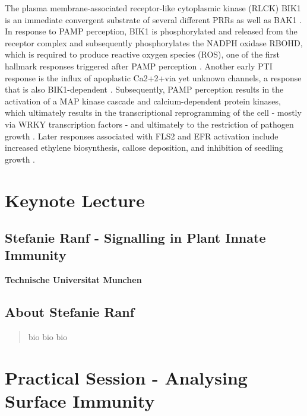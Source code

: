 \documentclass[12pt,]{book}
\begin{document}
The plasma membrane-associated receptor-like cytoplasmic kinase (RLCK)
BIK1 is an immediate convergent substrate of several different PRRs as
well as BAK1 \citep{Couto:2016kq}. In response to PAMP perception, BIK1
is phosphorylated and released from the receptor complex and
subsequently phosphorylates the NADPH oxidase RBOHD, which is required
to produce reactive oxygen species (ROS), one of the first hallmark
responses triggered after PAMP perception
\citep{Kadota:2014bi, Li:2014dx}. Another early PTI response is the
influx of apoplastic Ca2+2+via yet unknown channels, a response that is
also BIK1-dependent \citep{Li:2014dx, Ranf:2014fg, Seybold:2014wt}.
Subsequently, PAMP perception results in the activation of a MAP kinase
cascade and calcium-dependent protein kinases, which ultimately results
in the transcriptional reprogramming of the cell - mostly via WRKY
transcription factors - and ultimately to the restriction of pathogen
growth \citep{Couto:2016kq}. Later responses associated with FLS2 and
EFR activation include increased ethylene biosynthesis, callose
deposition, and inhibition of seedling growth \citep{Boller:2009hu}.

\section*{Keynote Lecture}\label{keynote-lecture-3}

\subsection*{Stefanie Ranf - Signalling in Plant Innate
Immunity}\label{stefanie-ranf---signalling-in-plant-innate-immunity}

\textbf{Technische Universitat Munchen}

\subsection*{About Stefanie Ranf}\label{about-stefanie-ranf}

\begin{quote}
bio bio bio
\end{quote}

\section*{Practical Session - Analysing Surface
Immunity}\label{practical-session---analysing-surface-immunity}
\end{document}
